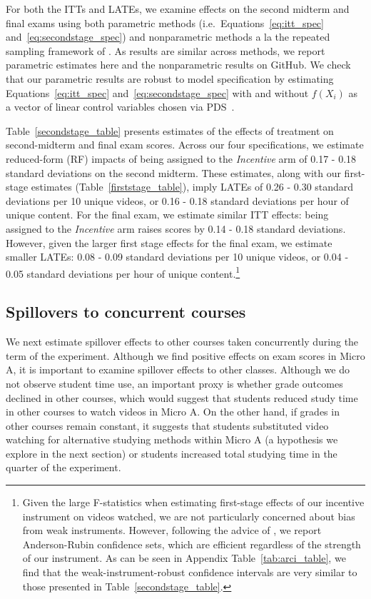 \documentclass[12pt]{article}
\begin{document}
For both the ITTs and LATEs, we examine effects on the second midterm and final exams using both parametric methods (i.e.\ Equations~\ref{eq:itt_spec} and~\ref{eq:secondstage_spec}) and nonparametric methods a la the repeated sampling framework of \textcite{neyman1923}.
As results are similar across methods, we report parametric estimates here and the nonparametric results on GitHub.
We check that our parametric results are robust to model specification by estimating Equations~\ref{eq:itt_spec} and~\ref{eq:secondstage_spec} with and without $f(X_i)$ as a vector of linear control variables chosen via PDS~\parencite{bch2014a}.

Table~\ref{secondstage_table} presents estimates of the effects of treatment on second-midterm and final exam scores.
Across our four specifications, we estimate reduced-form (RF) impacts of being assigned to the \textit{Incentive} arm of 0.17 - 0.18 standard deviations on the second midterm.
These estimates, along with our first-stage estimates (Table~\ref{firststage_table}), imply LATEs of 0.26 - 0.30 standard deviations per 10 unique videos, or 0.16 - 0.18 standard deviations per hour of unique content.
For the final exam, we estimate similar ITT effects: being assigned to the \textit{Incentive} arm raises scores by 0.14 - 0.18 standard deviations.
However, given the larger first stage effects for the final exam, we estimate smaller LATEs: 0.08 - 0.09 standard deviations per 10 unique videos, or 0.04 - 0.05 standard deviations per hour of unique content.\footnote{Given the large F-statistics when estimating first-stage effects of our incentive instrument on videos watched, we are not particularly concerned about bias from weak instruments. However, following the advice of \textcite{ass2019}, we report Anderson-Rubin confidence sets, which are efficient regardless of the strength of our instrument. As can be seen in Appendix Table~\ref{tab:arci_table}, we find that the weak-instrument-robust confidence intervals are very similar to those presented in Table~\ref{secondstage_table}.}

\subsection{Spillovers to concurrent courses}\label{subsec:spillovers}

We next estimate spillover effects to other courses taken concurrently during the term of the experiment.
Although we find positive effects on exam scores in Micro A, it is important to examine spillover effects to other classes.
Although we do not observe student time use, an important proxy is whether grade outcomes declined in other courses, which would suggest that students reduced study time in other courses to watch videos in Micro A. On the other hand, if grades in other courses remain constant, it suggests that students substituted video watching for alternative studying methods within Micro A (a hypothesis we explore in the next section) or students increased total studying time in the quarter of the experiment.
\end{document}
